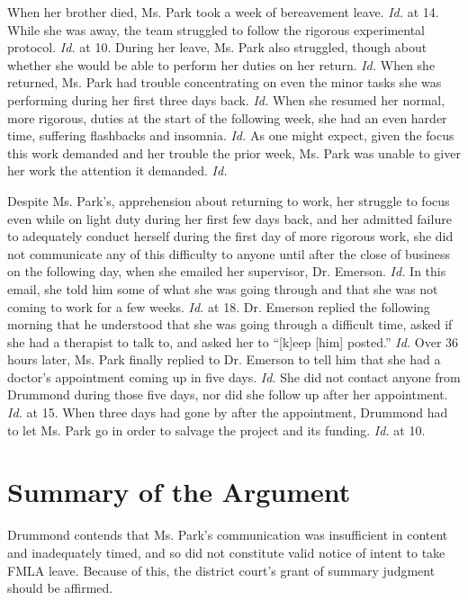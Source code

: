 When her brother died, Ms. Park took a week of bereavement leave. \emph{Id.} at 14. While she was away, the team struggled to follow the rigorous experimental protocol. \emph{Id.} at 10. During her leave, Ms. Park also struggled, though about whether she would be able to perform her duties on her return. \emph{Id.} When she returned, Ms. Park had trouble concentrating on even the minor tasks she was performing during her first three days back. \emph{Id.} When she resumed her normal, more rigorous, duties at the start of the following week, she had an even harder time, suffering flashbacks and insomnia. \emph{Id.} As one might expect, given the focus this work demanded and her trouble the prior week, Ms. Park was unable to giver her work the attention it demanded. \emph{Id.}

Despite Ms. Park's, apprehension about returning to work, her struggle to focus even while on light duty during her first few days back, and her admitted failure to adequately conduct herself during the first day of more rigorous work, she did not communicate any of this difficulty to anyone until after the close of business on the following day, when she emailed her supervisor, Dr. Emerson. \emph{Id.} In this email, she told him some of what she was going through and that she was not coming to work for a few weeks. \emph{Id.} at 18. Dr. Emerson replied the following morning that he understood that she was going through a difficult time, asked if she had a therapist to talk to, and asked her to ``[k]eep [him] posted.'' \emph{Id.} Over 36 hours later, Ms. Park finally replied to Dr. Emerson to tell him that she had a doctor's appointment coming up in five days. \emph{Id.} She did not contact anyone from Drummond during those five days, nor did she follow up after her appointment. \emph{Id.} at 15. When three days had gone by after the appointment, Drummond had to let Ms. Park go in order to salvage the project and its funding. \emph{Id.} at 10.

\part{Summary of the Argument}
\label{summaryoftheargument}

Drummond contends that Ms. Park's communication was insufficient in content and inadequately timed, and so did not constitute valid notice of intent to take FMLA leave. Because of this, the district court's grant of summary judgment should be affirmed.

